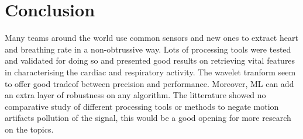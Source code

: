 \documentclass[twoside,onecolumn]{article}
\begin{document}
\section{Conclusion}
Many teams around the world use common sensors and new ones to extract heart and breathing rate in a non-obtrussive way. Lots of processing tools were tested and validated for doing so and presented good results on retrieving vital features in characterising the cardiac and respiratory activity. The wavelet tranform seem to offer good tradeof between precision and performance. Moreover, ML can add an extra layer of robustness on any algorithm. The litterature showed no comparative study of different processing tools or methods to negate motion artifacts pollution of the signal, this would be a good opening for more research on the topics.
\newpage



 
\end{document}
